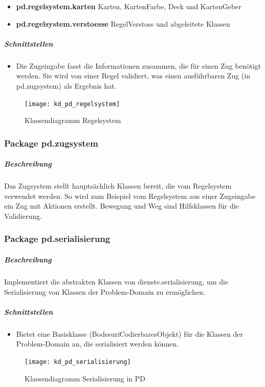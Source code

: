 \documentclass[12pt,halfparskip]{scrartcl}
\begin{document}
\begin{itemize}
	\item \textbf{pd.regelsystem.karten} Karten, KartenFarbe, Deck und KartenGeber
	\item \textbf{pd.regelsystem.verstoesse} RegelVerstoss und abgeleitete Klassen
\end{itemize}

\subparagraph{Schnittstellen}
\begin{itemize}
	\item Die Zugeingabe fasst die Informationen zusammen, die für einen Zug benötigt werden. Sie wird von einer Regel validiert, was einen ausführbaren Zug (in pd.zugsystem) als Ergebnis hat.
\end{itemize}

\begin{figure}[h]
	\centering
	\texttt{[image: kd\_pd\_regelsystem]}
	\caption{Klassendiagramm Regelsystem}
	\label{fig:kd_pd_regelsystem}
\end{figure}

\clearpage
\subsubsection{Package pd.zugsystem}
\subparagraph{Beschreibung}
Das Zugsystem stellt hauptsächlich Klassen bereit, die vom Regelsystem verwendet werden. So wird zum Beispiel vom Regelsystem aus einer Zugeingabe ein Zug mit Aktionen erstellt. Bewegung und Weg sind Hilfsklassen für die Validierung.

\clearpage
\subsubsection{Package pd.serialisierung}

\subparagraph{Beschreibung}
Implementiert die abstrakten Klassen von dienste.serialisierung, um die Serialisierung von Klassen der Problem-Domain zu ermöglichen.

\subparagraph{Schnittstellen}
\begin{itemize}
	\item Bietet eine Basisklasse (BodesuriCodierbaresObjekt) für die Klassen der Problem-Domain an, die serialisiert werden können.
\end{itemize}

\begin{figure}[h]
	\centering
	\texttt{[image: kd\_pd\_serialisierung]}
	\caption{Klassendiagramm Serialisierung in PD}
	\label{fig:kd_pd_serialisierung}
\end{figure}
\end{document}
